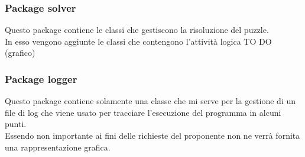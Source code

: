 		\subsubsection{Package solver} %
		\label{ssub:package_solver_2}
		Questo package contiene le classi che gestiscono la risoluzione del puzzle. \\
		In esso vengono aggiunte le classi che contengono l'attività logica
		TO DO (grafico)
		
		\subsubsection{Package logger} %
		\label{ssub:package_logger}
		Questo package contiene solamente una classe che mi serve per la gestione di un file di log che viene usato per tracciare l'esecuzione del programma in alcuni punti. \\
		Essendo non importante ai fini delle richieste del proponente non ne verrà fornita una rappresentazione grafica.

